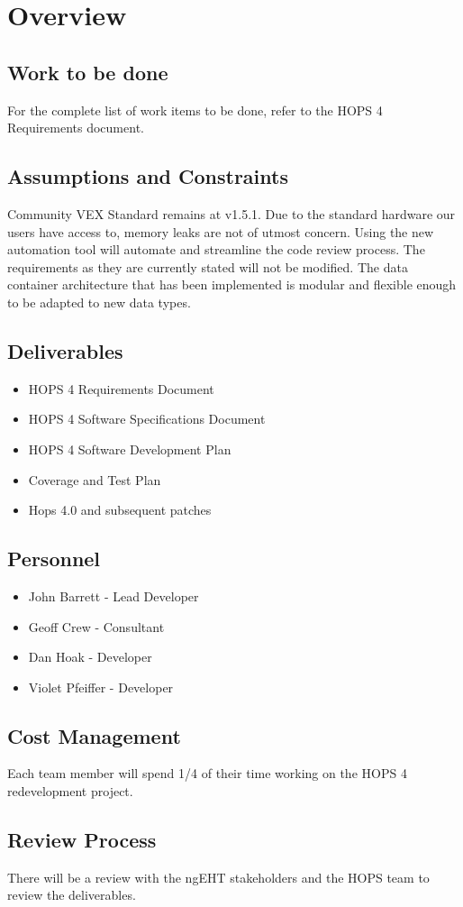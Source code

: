 %
%
\section{Overview}
\label{sec:overview}
\subsection{Work to be done}
For the complete list of work items to be done, refer to the HOPS 4 Requirements document.
\subsection{Assumptions and Constraints}
Community VEX Standard remains at v1.5.1.
Due to the standard hardware our users have access to, memory leaks are not of utmost concern. 
Using the new automation tool will automate and streamline the code review process.
The requirements as they are currently stated will not be modified.
The data container architecture that has been implemented is modular and flexible enough to be adapted to new data types.

\subsection{Deliverables}
\begin{itemize}
\item HOPS 4 Requirements Document
\item HOPS 4 Software Specifications Document
\item HOPS 4 Software Development Plan
\item Coverage and Test Plan
\item Hops 4.0 and subsequent patches
\end{itemize}

\subsection{Personnel}
\begin{itemize}
\item John Barrett - Lead Developer
\item Geoff Crew - Consultant
\item Dan Hoak - Developer
\item Violet Pfeiffer - Developer
\end{itemize}

\subsection{Cost Management}
Each team member will spend 1/4 of their time working on the HOPS 4 redevelopment project.

\subsection{Review Process}
There will be a review with the ngEHT stakeholders and the HOPS team to review the deliverables.
%
%

